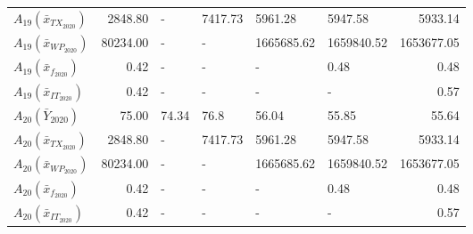 \begin{tabular}{lrllllr}
$A_{19}(\bar{x}_{TX_{2020}})$ &  2848.80 &                   - &             7417.73 &             5961.28 &             5947.58 &              5933.14 \\
$A_{19}(\bar{x}_{WP_{2020}})$ & 80234.00 &                   - &                   - &          1665685.62 &          1659840.52 &           1653677.05 \\
 $A_{19}(\bar{x}_{f_{2020}})$ &     0.42 &                   - &                   - &                   - &                0.48 &                 0.48 \\
$A_{19}(\bar{x}_{IT_{2020}})$ &     0.42 &                   - &                   - &                   - &                   - &                 0.57 \\
     $A_{20}(\bar{Y}_{2020})$ &    75.00 &               74.34 &                76.8 &               56.04 &               55.85 &                55.64 \\
$A_{20}(\bar{x}_{TX_{2020}})$ &  2848.80 &                   - &             7417.73 &             5961.28 &             5947.58 &              5933.14 \\
$A_{20}(\bar{x}_{WP_{2020}})$ & 80234.00 &                   - &                   - &          1665685.62 &          1659840.52 &           1653677.05 \\
 $A_{20}(\bar{x}_{f_{2020}})$ &     0.42 &                   - &                   - &                   - &                0.48 &                 0.48 \\
$A_{20}(\bar{x}_{IT_{2020}})$ &     0.42 &                   - &                   - &                   - &                   - &                 0.57 \\
\bottomrule
\end{tabular}

